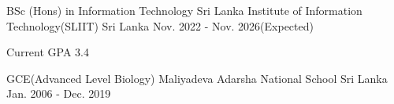 

\begin{cventries}

  \cventry
    {BSc (Hons) in Information Technology} %
    {Sri Lanka Institute of Information Technology(SLIIT)} %
    {Sri Lanka} %
    {Nov. 2022 - Nov. 2026(Expected)} %
    {
      \begin{cvitems} %
        \item {Current GPA 3.4}
      \end{cvitems}
    }

  \cventry
    {GCE(Advanced Level Biology)} %
    {Maliyadeva Adarsha National School} %
    {Sri Lanka} %
    {Jan. 2006 - Dec. 2019} %
    {
    }

\end{cventries}

